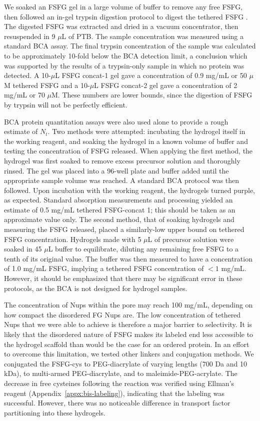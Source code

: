 
We soaked an FSFG gel in a large volume of buffer to remove any free FSFG, then followed an in-gel trypsin digestion protocol to digest the tethered FSFG \cite{shevchenko06,gundry09}.  The digested FSFG was extracted and dried in a vacuum concentrator, then resuspended in 9 $\mu$L of PTB.  The sample concentration was measured using a standard BCA assay.  The final trypsin concentration of the sample was calculated to be approximately 10-fold below the BCA detection limit, a conclusion which was supported by the results of a trypsin-only sample in which no protein was detected.  A 10-$\mu$L FSFG concat-1 gel gave a concentration of  0.9 mg/mL or 50 $\mu$M tethered FSFG and a 10-$\mu$L FSFG concat-2 gel gave a concentration of 2 mg/mL or 70 $\mu$M.  These numbers are lower bounds, since the digestion of FSFG by trypsin will not be perfectly efficient.

 BCA protein quantitation assays were also used alone to provide a rough estimate of $N_t$.  Two methods were attempted: incubating the hydrogel itself in the working reagent, and soaking the hydrogel in a known volume of buffer and testing the concentration of FSFG released.  When applying the first method, the hydrogel was first soaked to remove excess precursor solution and thoroughly rinsed.  The gel was placed into a 96-well plate and buffer added until the appropriate sample volume was reached.  A standard BCA protocol was then followed.  Upon incubation with the working reagent, the hydrogels turned purple, as expected.  Standard absorption measurements and processing yielded an estimate of 0.5 mg/mL tethered FSFG-concat 1; this should be taken as an approximate value only.  The second method, that of soaking hydrogels and measuring the FSFG released, placed a similarly-low upper bound on tethered FSFG concentration.  Hydrogels made with 5 $\mu$L of precursor solution were soaked in 45 $\mu$L buffer to equilibrate, diluting any remaining free FSFG to a tenth of its original value.  The buffer was then measured to have a concentration of 1.0 mg/mL FSFG, implying a tethered FSFG concentration of $<1$ mg/mL.  However, it should be emphasized that there may be significant error in these protocols, as the BCA is not designed for hydrogel samples.

The concentration of Nups within the pore may reach 100 mg/mL, depending on how compact the disordered FG Nups are.  The low concentration of tethered Nups that we were able to achieve is therefore a major barrier to selectivity.  It is likely that the disordered nature of FSFG makes its labeled end less accessible to the hydrogel scaffold than would be the case for an ordered protein.  In an effort to overcome this limitation, we tested other linkers and conjugation methods.  We conjugated the FSFG-cys to PEG-diacrylate of varying lengths (700 Da and 10 kDa), to multi-armed PEG-diacrylate, and to maleimide-PEG-acrylate.  The decrease in free cysteines following the reaction was verified using Ellman's reagent (Appendix~\ref{appx:bis-labeling}), indicating that the labeling was successful.  However, there was no noticeable difference in transport factor partitioning into these hydrogels.

